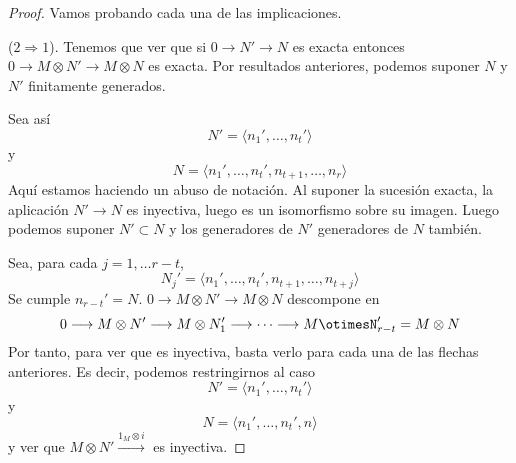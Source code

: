 \documentclass[../main.tex]{subfiles}
\begin{document}
\begin{proof} Vamos probando cada una de las implicaciones.
	
	($2\Rightarrow1$). Tenemos que ver que si $0\rightarrow N'\rightarrow N$ es exacta entonces $0\rightarrow M\otimes N'\rightarrow M\otimes N$ es exacta. Por resultados anteriores, podemos suponer $N$ y $N'$ finitamente generados.
	
	Sea así $$N'=\langle n_1',\dots,n_t'\rangle$$ y $$N=\langle n_1',\dots,n_t',n_{t+1},\dots,n_r\rangle$$ Aquí estamos haciendo un abuso de notación. Al suponer la sucesión exacta, la aplicación $N'\rightarrow N$ es inyectiva, luego es un isomorfismo sobre su imagen. Luego podemos suponer $N'\subset N$ y los generadores de $N'$ generadores de $N$ también.
	
	Sea, para cada $j=1,\dots r-t$, $$N_j'=\langle n_1',\dots,n_t',n_{t+1},\dots,n_{t+j}\rangle$$ Se cumple $n_{r-t}'=N$. $0\rightarrow M\otimes N'\rightarrow M\otimes N$ descompone en $$0\longrightarrow M\otimes N'\longrightarrow M\otimes N_1'\longrightarrow\dots\longrightarrow M\otimesN_{r-t}'=M\otimes N$$ Por tanto, para ver que es inyectiva, basta verlo para cada una de las flechas anteriores. Es decir, podemos restringirnos al caso $$N'=\langle n_1',\dots,n_t'\rangle$$ y $$N=\langle n_1',\dots,n_t',n\rangle$$ y ver que $M\otimes N'\overset{1_M\otimes i}{\longrightarrow}$ es inyectiva.
	

\end{proof}
\end{document}
